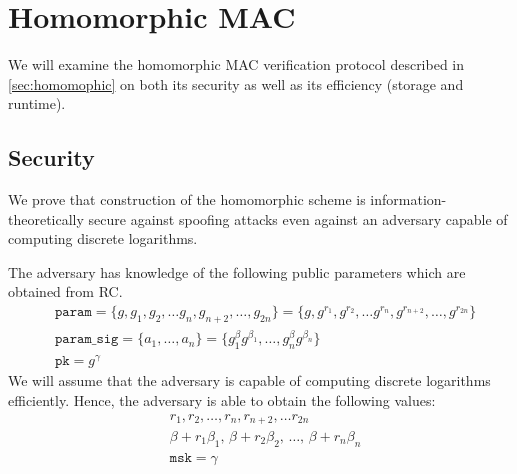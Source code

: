 \documentclass[hyp,a4paper,12pt,openbib]{socreport}
\begin{document}
\section{Homomorphic MAC}
\label{sec:homo-analyze}
We will examine the homomorphic MAC verification protocol described in \cref{sec:homomophic} on both its security as well as its efficiency (storage and runtime). 

\subsection{Security}
\label{sec:proof}
We prove that construction of the homomorphic scheme is information-theoretically secure against spoofing attacks even against an adversary capable of computing discrete logarithms. 

The adversary has knowledge of the following public parameters which are obtained from RC.
\begin{align*}
&\texttt{param} = \{g, g_1, g_2, \dots g_n, g_{n+2}, \dots, g_{2n}\} = \{g, g^{r_1}, g^{r_2}, \dots g^{r_n}, g^{r_{n+2}}, \dots, g^{r_{2n}}\} \\
& \texttt{param\_sig} = \{a_1, \dots, a_n\} = \{g_1^{\beta}  g^{\beta_1}, \dots, g_n^{\beta}  g^{\beta_n}\} \\
& \texttt{pk} = g^{\gamma}
\end{align*}
We will assume that the adversary is capable of computing discrete logarithms efficiently. Hence, the adversary is able to obtain the following values:
\begin{align}
\label{eqn:r} & r_1, r_2, \dots, r_n, r_{n+2}, \dots r_{2n} \\ 
\label{eqn:b} & \beta+r_1\beta_1  , \, \beta+r_2\beta_2 , \, \dots, \, \beta + r_n \beta_n \\
& \texttt{msk} = \gamma
\end{align}
\end{document}
